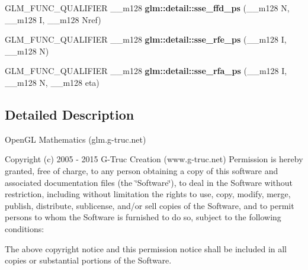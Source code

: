 \begin{DoxyCompactItemize}
\item 
\hypertarget{namespaceglm_1_1detail_ace9256f388e836f9411a6eb92bed1a8a}{G\-L\-M\-\_\-\-F\-U\-N\-C\-\_\-\-Q\-U\-A\-L\-I\-F\-I\-E\-R \-\_\-\-\_\-m128 {\bfseries glm\-::detail\-::sse\-\_\-ffd\-\_\-ps} (\-\_\-\-\_\-m128 N, \-\_\-\-\_\-m128 I, \-\_\-\-\_\-m128 Nref)}\label{namespaceglm_1_1detail_ace9256f388e836f9411a6eb92bed1a8a}

\item 
\hypertarget{namespaceglm_1_1detail_a48dc48d40e141bd2fff6b9c88b7e05e4}{G\-L\-M\-\_\-\-F\-U\-N\-C\-\_\-\-Q\-U\-A\-L\-I\-F\-I\-E\-R \-\_\-\-\_\-m128 {\bfseries glm\-::detail\-::sse\-\_\-rfe\-\_\-ps} (\-\_\-\-\_\-m128 I, \-\_\-\-\_\-m128 N)}\label{namespaceglm_1_1detail_a48dc48d40e141bd2fff6b9c88b7e05e4}

\item 
\hypertarget{namespaceglm_1_1detail_a5086fa9f09dcfec333b9eebeae468767}{G\-L\-M\-\_\-\-F\-U\-N\-C\-\_\-\-Q\-U\-A\-L\-I\-F\-I\-E\-R \-\_\-\-\_\-m128 {\bfseries glm\-::detail\-::sse\-\_\-rfa\-\_\-ps} (\-\_\-\-\_\-m128 I, \-\_\-\-\_\-m128 N, \-\_\-\-\_\-m128 eta)}\label{namespaceglm_1_1detail_a5086fa9f09dcfec333b9eebeae468767}

\end{DoxyCompactItemize}


\subsection{Detailed Description}
Open\-G\-L Mathematics (glm.\-g-\/truc.\-net)

Copyright (c) 2005 -\/ 2015 G-\/\-Truc Creation (www.\-g-\/truc.\-net) Permission is hereby granted, free of charge, to any person obtaining a copy of this software and associated documentation files (the \char`\"{}\-Software\char`\"{}), to deal in the Software without restriction, including without limitation the rights to use, copy, modify, merge, publish, distribute, sublicense, and/or sell copies of the Software, and to permit persons to whom the Software is furnished to do so, subject to the following conditions\-:

The above copyright notice and this permission notice shall be included in all copies or substantial portions of the Software.

